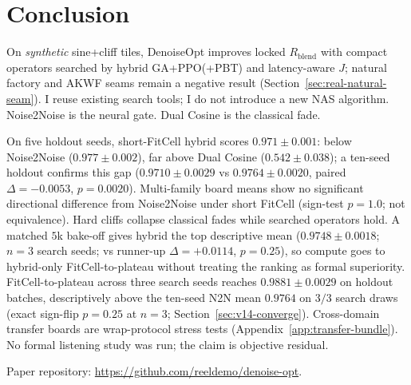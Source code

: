 \section{Conclusion}
\label{sec:conclusion}

On \emph{synthetic} sine+cliff tiles, DenoiseOpt improves locked $R_{\mathrm{blend}}$ with compact operators searched by hybrid GA+PPO(+PBT) and latency-aware $J$; natural factory and AKWF seams remain a negative result (Section~\ref{sec:real-natural-seam}).
I reuse existing search tools; I do not introduce a new NAS algorithm.
Noise2Noise is the neural gate. Dual Cosine is the classical fade.

On five holdout seeds, short-FitCell hybrid scores $0.971{\pm}0.001$: below Noise2Noise ($0.977{\pm}0.002$), far above Dual Cosine ($0.542{\pm}0.038$); a ten-seed holdout confirms this gap ($0.9710{\pm}0.0029$ vs $0.9764{\pm}0.0020$, paired $\Delta{=}{-}0.0053$, $p{=}0.0020$).
Multi-family board means show no significant directional difference from Noise2Noise under short FitCell (sign-test $p{=}1.0$; not equivalence).
Hard cliffs collapse classical fades while searched operators hold.
A matched $5$k bake-off gives hybrid the top descriptive mean ($0.9748{\pm}0.0018$; $n{=}3$ search seeds; vs runner-up $\Delta{=}{+}0.0114$, $p{=}0.25$), so compute goes to hybrid-only FitCell-to-plateau without treating the ranking as formal superiority.
FitCell-to-plateau across three search seeds reaches $0.9881{\pm}0.0029$ on holdout batches, descriptively above the ten-seed N2N mean $0.9764$ on $3/3$ search draws (exact sign-flip $p{=}0.25$ at $n{=}3$; Section~\ref{sec:v14-converge}).
Cross-domain transfer boards are wrap-protocol stress tests (Appendix~\ref{app:transfer-bundle}).
No formal listening study was run; the claim is objective residual.

Paper repository: \url{https://github.com/reeldemo/denoise-opt}.
